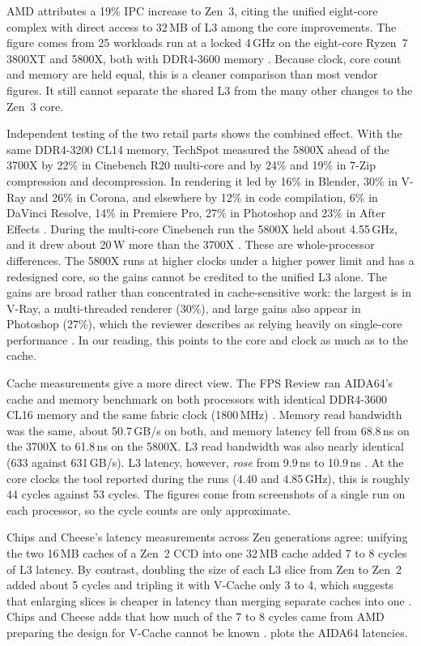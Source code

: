 AMD attributes a 19\% IPC increase to Zen~3, citing the unified eight-core complex with direct access to 32\,MB of L3 among the core improvements. The figure comes from 25 workloads run at a locked 4\,GHz on the eight-core Ryzen~7 3800XT and 5800X, both with DDR4-3600 memory \cite[note~4]{advancedmicrodevicesinc.AMDLaunchesAMD2020}. Because clock, core count and memory are held equal, this is a cleaner comparison than most vendor figures. It still cannot separate the shared L3 from the many other changes to the Zen~3 core.

Independent testing of the two retail parts shows the combined effect. With the same DDR4-3200 CL14 memory, TechSpot measured the 5800X ahead of the 3700X by 22\% in Cinebench R20 multi-core and by 24\% and 19\% in 7-Zip compression and decompression. In rendering it led by 16\% in Blender, 30\% in V-Ray and 26\% in Corona, and elsewhere by 12\% in code compilation, 6\% in DaVinci Resolve, 14\% in Premiere Pro, 27\% in Photoshop and 23\% in After Effects \cite{waltonAMDRyzen72020}. During the multi-core Cinebench run the 5800X held about 4.55\,GHz, and it drew about 20\,W more than the 3700X \cite{waltonAMDRyzen72020}. These are whole-processor differences. The 5800X runs at higher clocks under a higher power limit and has a redesigned core, so the gains cannot be credited to the unified L3 alone. The gains are broad rather than concentrated in cache-sensitive work: the largest is in V-Ray, a multi-threaded renderer (30\%), and large gains also appear in Photoshop (27\%), which the reviewer describes as relying heavily on single-core performance \cite{waltonAMDRyzen72020}. In our reading, this points to the core and clock as much as to the cache.

Cache measurements give a more direct view. The FPS Review ran AIDA64's cache and memory benchmark on both processors with identical DDR4-3600 CL16 memory and the same fabric clock (1800\,MHz) \cite{justiceAMDRyzen72021}. Memory read bandwidth was the same, about 50.7\,GB/s on both, and memory latency fell from 68.8\,ns on the 3700X to 61.8\,ns on the 5800X. L3 read bandwidth was also nearly identical (633 against 631\,GB/s). L3 latency, however, \emph{rose} from 9.9\,ns to 10.9\,ns \cite{justiceAMDRyzen72021}. At the core clocks the tool reported during the runs (4.40 and 4.85\,GHz), this is roughly 44 cycles against 53 cycles. The figures come from screenshots of a single run on each processor, so the cycle counts are only approximate.

Chips and Cheese's latency measurements across Zen generations agree: unifying the two 16\,MB caches of a Zen~2 CCD into one 32\,MB cache added 7 to 8 cycles of L3 latency. By contrast, doubling the size of each L3 slice from Zen to Zen~2 added about 5 cycles and tripling it with V-Cache only 3 to 4, which suggests that enlarging slices is cheaper in latency than merging separate caches into one \cite{cozmaDeepDivingZen2022}. Chips and Cheese adds that how much of the 7 to 8 cycles came from AMD preparing the design for V-Cache cannot be known \cite{cozmaDeepDivingZen2022}.  plots the AIDA64 latencies.


